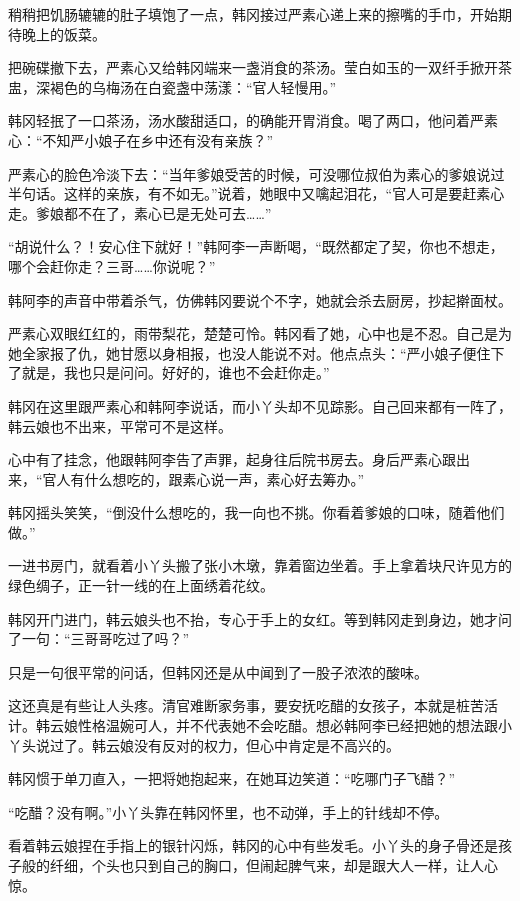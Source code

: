 稍稍把饥肠辘辘的肚子填饱了一点，韩冈接过严素心递上来的擦嘴的手巾，开始期待晚上的饭菜。

把碗碟撤下去，严素心又给韩冈端来一盏消食的茶汤。莹白如玉的一双纤手掀开茶盅，深褐色的乌梅汤在白瓷盏中荡漾：“官人轻慢用。”

韩冈轻抿了一口茶汤，汤水酸甜适口，的确能开胃消食。喝了两口，他问着严素心：“不知严小娘子在乡中还有没有亲族？”

严素心的脸色冷淡下去：“当年爹娘受苦的时候，可没哪位叔伯为素心的爹娘说过半句话。这样的亲族，有不如无。”说着，她眼中又噙起泪花，“官人可是要赶素心走。爹娘都不在了，素心已是无处可去……”

“胡说什么？！安心住下就好！”韩阿李一声断喝，“既然都定了契，你也不想走，哪个会赶你走？三哥……你说呢？”

韩阿李的声音中带着杀气，仿佛韩冈要说个不字，她就会杀去厨房，抄起擀面杖。

严素心双眼红红的，雨带梨花，楚楚可怜。韩冈看了她，心中也是不忍。自己是为她全家报了仇，她甘愿以身相报，也没人能说不对。他点点头：“严小娘子便住下了就是，我也只是问问。好好的，谁也不会赶你走。”

韩冈在这里跟严素心和韩阿李说话，而小丫头却不见踪影。自己回来都有一阵了，韩云娘也不出来，平常可不是这样。

心中有了挂念，他跟韩阿李告了声罪，起身往后院书房去。身后严素心跟出来，“官人有什么想吃的，跟素心说一声，素心好去筹办。”

韩冈摇头笑笑，“倒没什么想吃的，我一向也不挑。你看着爹娘的口味，随着他们做。”

一进书房门，就看着小丫头搬了张小木墩，靠着窗边坐着。手上拿着块尺许见方的绿色绸子，正一针一线的在上面绣着花纹。

韩冈开门进门，韩云娘头也不抬，专心于手上的女红。等到韩冈走到身边，她才问了一句：“三哥哥吃过了吗？”

只是一句很平常的问话，但韩冈还是从中闻到了一股子浓浓的酸味。

这还真是有些让人头疼。清官难断家务事，要安抚吃醋的女孩子，本就是桩苦活计。韩云娘性格温婉可人，并不代表她不会吃醋。想必韩阿李已经把她的想法跟小丫头说过了。韩云娘没有反对的权力，但心中肯定是不高兴的。

韩冈惯于单刀直入，一把将她抱起来，在她耳边笑道：“吃哪门子飞醋？”

“吃醋？没有啊。”小丫头靠在韩冈怀里，也不动弹，手上的针线却不停。

看着韩云娘捏在手指上的银针闪烁，韩冈的心中有些发毛。小丫头的身子骨还是孩子般的纤细，个头也只到自己的胸口，但闹起脾气来，却是跟大人一样，让人心惊。

